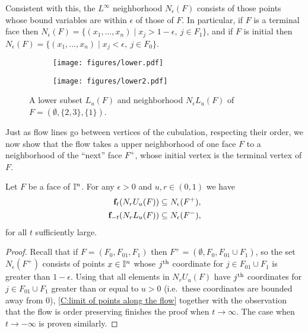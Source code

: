 Consistent with this, the $L^\infty$ neighborhood $N_\epsilon(F)$ consists of those points whose bound variables are within $\epsilon$ of those of $F$.
In particular, if $F$ is a terminal face then $N_\epsilon(F)=\{ (x_1,\ldots, x_n)\mid x_j>1-\epsilon,\ j\in F_1\}$, and if $F$ is initial then $N_\epsilon(F)=\{ (x_1,\ldots, x_n)\mid x_j<\epsilon,\ j\in F_0\}$.

\begin{figure}[!h]
	\centering
	\begin{subfigure}{.32\textwidth}
		\texttt{[image: figures/lower.pdf]}
		\hfill
	\end{subfigure}
	\begin{subfigure}{.32\textwidth}
		\vspace*{-14pt}
		\hfill
		\texttt{[image: figures/lower2.pdf]}
	\end{subfigure}
	\caption{A lower subset $L_u(F)$ and neighborhood $N_\epsilon L_u(F)$ of $F = (\emptyset, \{2,3\}, \{1\})$.}
	\label{F:lower subspace and nbhd}
\end{figure}

Just as flow lines go between vertices of the cubulation, respecting their order, we now show that the flow takes a upper neighborhood of one face $F$ to a neighborhood of the ``next'' face $F^+$, whose initial vertex is the terminal vertex of $F$.

\begin{lemma}\label{L:flow to initial and terminal faces}
	Let $F$ be a face of $\mathbb{I}^n$.
	For any $\epsilon > 0$ and $u,r \in (0, 1)$ we have
	\begin{align*}
		\mathbf{f}_{t}(N_r U_u (F)) &\subseteq N_\epsilon (F^+), \\
		\mathbf{f}_{-t}(N_r L_u (F)) &\subseteq N_\epsilon (F^-),
	\end{align*}
	for all $t$ sufficiently large.
\end{lemma}

\begin{proof}
	Recall that if $F = (F_0, F_{01}, F_1)$ then $F^+ = (\emptyset, F_0, F_{01} \cup F_1)$, so the set $N_\epsilon (F^+)$ consists of points $x \in \mathbb{I}^n$ whose $j^{\mathrm{th}}$ coordinate for $j \in F_{01} \cup F_1$ is greater than $1-\epsilon$.
	Using that all elements in $N_r U_u (F)$ have $j^{\mathrm{th}}$ coordinates for $j \in F_{01} \cup F_1$ greater than or equal to $u > 0$ (i.e.\ these coordinates are bounded away from $0$), \cref{C:limit of points along the flow} together with the observation that the flow is order preserving finishes the proof when $t \to \infty$.
	The case when $t \to -\infty$ is proven similarly.
\end{proof}

